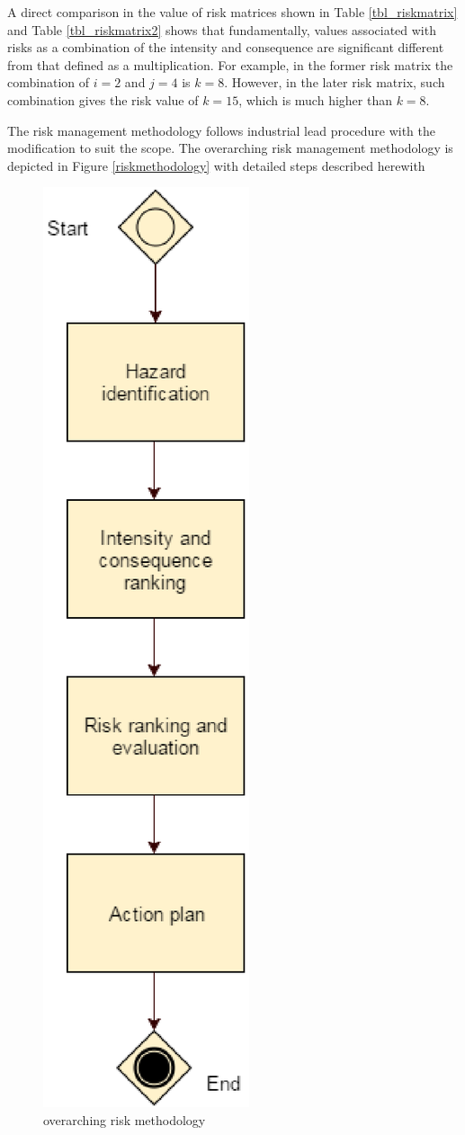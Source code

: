 \documentclass[10pt,halfline,a4paper]{ouparticle}
\begin{document}
A direct comparison in the value of risk matrices shown in Table \ref{tbl_riskmatrix} and Table \ref{tbl_riskmatrix2} shows that fundamentally, values associated with risks as a combination of the intensity and consequence are significant different from that defined as a multiplication. For example, in the former risk matrix the combination of $i=2$ and $j=4$ is $k=8$. However, in the later risk matrix, such combination gives the risk value of $k=15$, which is much higher than $k=8$. 

The risk management methodology follows industrial lead procedure with the modification to suit the scope. 
The overarching risk management methodology is depicted in Figure \ref{riskmethodology} with detailed steps described herewith

\begin{figure}[!ht]
\centering \includegraphics[scale=0.5]{risk-methodology} \caption{overarching risk methodology}

\end{figure}
\end{document}
